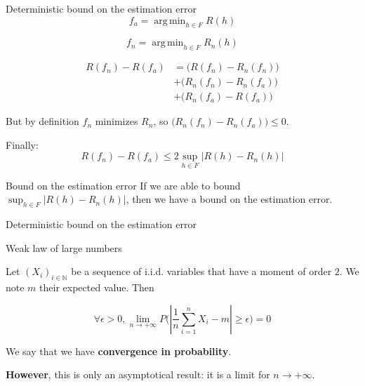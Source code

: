 \documentclass[usenames,dvipsnames]{beamer}
\DeclareMathOperator*{\argmin}{arg\,min}
\begin{document}
\begin{frame}{Deterministic bound on the estimation error}
    \begin{equation*}
	f_a = \argmin_{h\in F}R(h)
    \end{equation*}

    \begin{equation}
	f_n = \argmin_{h\in F}R_n(h)
    \end{equation}

    \begin{equation}
        \begin{aligned}
	    R(f_n)-R(f_a) &= \big(R(f_n)-R_n( f_n)\big)\\
	    &+\big(R_n( f_n)- R_n(f_a)\big)\\
	    &+\big(R_n(f_a)-R(f_a)\big)
        \end{aligned}
    \end{equation}

    But by definition $ f_n$ minimizes $R_n$, so $ \big( R_n ( f_n)-R_n(f_a)\big)\leq 0$.

    Finally:
    \begin{equation}
	R( f_n)-R(f_a)\leq 2 \sup_{h\in F}|R(h)-R_n(h)|
    \end{equation}

\end{frame}

\begin{frame}{Bound on the estimation error}
    If we are able to bound $\sup_{h\in F}|R(h)-R_n(h)|$, then we have a bound on the estimation error.

\end{frame}


\begin{frame}{Deterministic bound on the estimation error}
\begin{theorem}{Weak law of large numbers}

    Let $(X_i)_{i\in \mathbb{N} }$ be a sequence of i.i.d. variables that have a moment of order $2$. We note $m$ their expected value. Then

    \begin{equation}
	\forall \epsilon > 0, \lim_{n\rightarrow+\infty}P\big( |\frac{1}{n} \sum^{n}_{i=1} X_i-m|\geq \epsilon \big)= 0
    \end{equation}

We say that we have \textbf{{convergence in probability}}.
\end{theorem}

\textbf{{However}}, this is only an asymptotical result: it is a limit for $ n \rightarrow +\infty$.
    
\end{frame}
\end{document}
